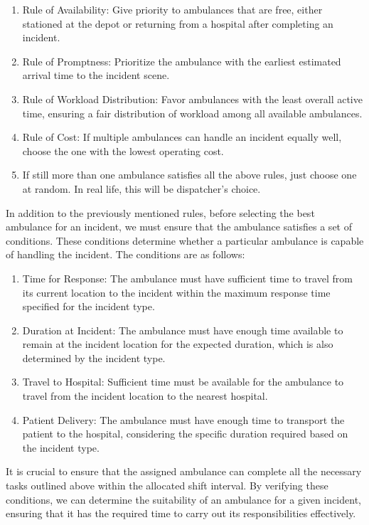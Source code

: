 \begin{enumerate}[(1)]
    \item Rule of Availability: Give priority to ambulances that are free, either
          stationed at the depot or returning from a hospital after completing an
          incident.
    \item Rule of Promptness: Prioritize the ambulance with the earliest estimated
          arrival time to the incident scene.
    \item Rule of Workload Distribution: Favor ambulances with the least overall active
          time, ensuring a fair distribution of workload among all available ambulances.
    \item Rule of Cost: If multiple ambulances can handle an incident equally well,
          choose the one with the lowest operating cost.
    \item If still more than one ambulance satisfies all the above rules, just choose one
          at random. In real life, this will be dispatcher's choice.
\end{enumerate}

In addition to the previously mentioned rules, before selecting the best
ambulance for an incident, we must ensure that the ambulance satisfies a set of
conditions. These conditions determine whether a particular ambulance is
capable of handling the incident. The conditions are as follows:

\begin{enumerate}[(1)]
    \item Time for Response: The ambulance must have sufficient time to travel from its
          current location to the incident within the maximum response time specified for
          the incident type.
    \item Duration at Incident: The ambulance must have enough time available to remain
          at the incident location for the expected duration, which is also determined by
          the incident type.
    \item Travel to Hospital: Sufficient time must be available for the ambulance to
          travel from the incident location to the nearest hospital.
    \item Patient Delivery: The ambulance must have enough time to transport the patient
          to the hospital, considering the specific duration required based on the
          incident type.
\end{enumerate}

It is crucial to ensure that the assigned ambulance can complete all the
necessary tasks outlined above within the allocated shift interval. By
verifying these conditions, we can determine the suitability of an ambulance
for a given incident, ensuring that it has the required time to carry out its
responsibilities effectively.

